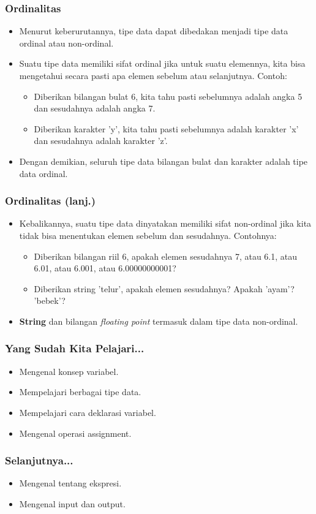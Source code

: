 \documentclass{beamer}
\begin{document}
\begin{frame}
\frametitle{Ordinalitas}
\begin{itemize}
	\item Menurut keberurutannya, tipe data dapat dibedakan menjadi tipe data \alert{ordinal} atau \alert{non-ordinal}.
	\item Suatu tipe data memiliki sifat ordinal jika untuk suatu elemennya, kita bisa mengetahui secara pasti apa elemen sebelum atau selanjutnya. Contoh:
	\begin{itemize}
		\item Diberikan bilangan bulat 6, kita tahu pasti sebelumnya adalah angka 5 dan sesudahnya adalah angka 7.
		\item Diberikan karakter 'y', kita tahu pasti sebelumnya adalah karakter 'x' dan sesudahnya adalah karakter 'z'.
	\end{itemize}
	\item Dengan demikian, seluruh tipe data bilangan bulat dan karakter adalah tipe data ordinal.
\end{itemize}
\end{frame}

\begin{frame}
\frametitle{Ordinalitas (lanj.)}
\begin{itemize}
	\item Kebalikannya, suatu tipe data dinyatakan memiliki sifat non-ordinal jika kita tidak bisa menentukan elemen sebelum dan sesudahnya. Contohnya:
	\begin{itemize}
		\item Diberikan bilangan riil 6, apakah elemen sesudahnya 7, atau 6.1, atau 6.01, atau 6.001, atau 6.00000000001?
		\item Diberikan string 'telur', apakah elemen sesudahnya? Apakah 'ayam'? 'bebek'?
	\end{itemize}
	\item \textbf{String} dan bilangan \textit{floating point} termasuk dalam tipe data non-ordinal.
\end{itemize}
\end{frame}

\begin{frame}
\frametitle{Yang Sudah Kita Pelajari...}
\begin{itemize}
	\item Mengenal konsep variabel.
	\item Mempelajari berbagai tipe data.
	\item Mempelajari cara deklarasi variabel.
	\item Mengenal operasi assignment.
\end{itemize}
\end{frame}

\begin{frame}
\frametitle{Selanjutnya...}
\begin{itemize}
	\item Mengenal tentang ekspresi.
	\item Mengenal input dan output.
\end{itemize}
\end{frame}
\end{document}
